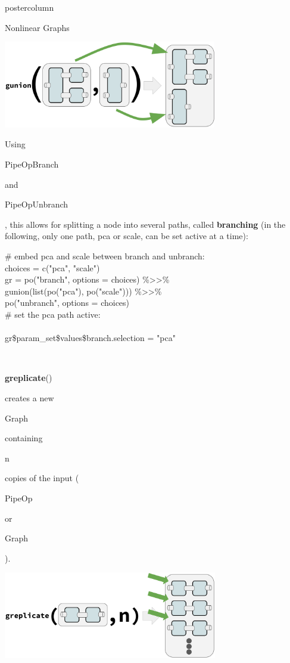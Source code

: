 \documentclass{beamer}
\newcommand{\codeinline}[1]{\begin{codeboxinline}#1\end{codeboxinline}}
\begin{document}
\begin{frame}[fragile]{}
\begin{columns}
\begin{column}{.245\textwidth}
\begin{beamercolorbox}[center]{postercolumn}
\begin{minipage}{.98\textwidth}
{\begin{myblock}{Nonlinear Graphs}
              \begin{center}
                \includegraphics[width=0.7\textwidth]{img/gunion.pdf}
              \end{center}
              Using \codeinline{PipeOpBranch} and \codeinline{PipeOpUnbranch}, this allows for splitting a node into several paths, called \textbf{branching} (in the following, only one path, pca or scale, can be set active at a time):
              \begin{codeboxexample}
						    {\footnotesize
                  \# embed pca and scale between branch and unbranch:\\
                  choices = c("pca", "scale")\\
                  gr = po("branch", options = choices) \%>{}>\%\\
                  \hspace*{1ex} gunion(list(po("pca"), po("scale"))) \%>{}>\%\\
                  \hspace*{1ex} po("unbranch", options = choices)\\
                  \# set the pca path active:\\
                  \ \\
                  gr\$param\_set\$values\$branch.selection = "pca"}
					      \end{codeboxexample}
              \ \\
              \codeinline{\textbf{greplicate}()} creates a new \codeinline{Graph} containing \codeinline{n} copies of the input (\codeinline{PipeOp} or \codeinline{Graph}).
              \begin{center}
                \includegraphics[width=0.7\textwidth]{img/greplicate.pdf}

\end{center}
\end{myblock}}
\end{minipage}
\end{beamercolorbox}
\end{column}
\end{columns}
\end{frame}
\end{document}
